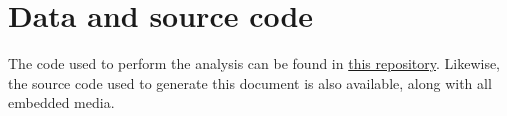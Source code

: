 \chapter{Data and source code}\label{data_and_source_code}
The code used to perform the analysis can be found in \href{https://github.com/cristiban/thesis}{this repository}. Likewise, the source code used to generate this document is also available, along with all embedded media.